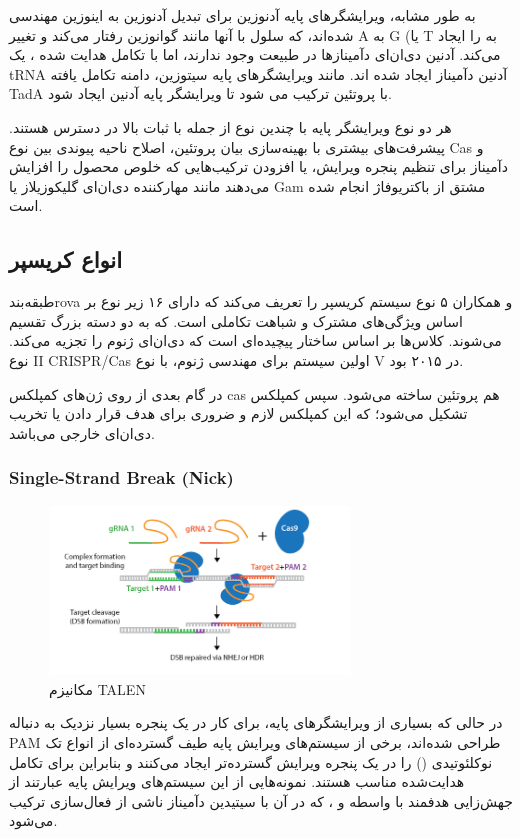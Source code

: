\documentclass[12pt,a4paper,BCOR=.7cm,headsepline,bibliography=totoc]{report}
\begin{document}
به طور مشابه، ویرایشگرهای پایه آدنوزین برای تبدیل آدنوزین به اینوزین مهندسی شده‌اند، که سلول با آنها مانند گوانوزین رفتار می‌کند و تغییر A به G (یا T به  را ایجاد می‌کند. آدنین دی‌ان‌ای دآمینازها در طبیعت وجود ندارند، اما با تکامل هدایت شده ، یک tRNA آدنین دآمیناز ایجاد شده اند. مانند ویرایشگرهای پایه سیتوزین، دامنه تکامل یافته TadA با پروتئین  ترکیب می شود تا ویرایشگر پایه آدنین ایجاد شود.

هر دو نوع ویرایشگر پایه با چندین نوع  از جمله  با ثبات بالا در دسترس هستند. پیشرفت‌های بیشتری با بهینه‌سازی بیان پروتئین، اصلاح ناحیه پیوندی بین نوع Cas و دآمیناز برای تنظیم پنجره ویرایش، یا افزودن ترکیب‌هایی که خلوص محصول را افزایش می‌دهند مانند مهارکننده دی‌ان‌ای گلیکوزیلاز  یا Gam مشتق از باکتریوفاژ  انجام شده است.






\subsection{انواع کریسپر}
طبقه‌بندrova و همکاران ۵ نوع سیستم کریسپر را تعریف می‌کند که دارای ۱۶ زیر نوع بر اساس ویژگی‌های مشترک و شباهت تکاملی است. که به دو دسته بزرگ تقسیم می‌شوند. کلاس‌ها بر اساس ساختار پیچیده‌ای است که دی‌ان‌ای ژنوم را تجزیه می‌کند. نوع II CRISPR/Cas اولین سیستم برای مهندسی ژنوم، با نوع V در ۲۰۱۵ بود.

در گام بعدی از روی ژن‌های کمپلکس cas هم پروتئین  ساخته می‌شود. سپس کمپلکس
  تشکیل می‌شود؛ که این کمپلکس لازم و ضروری برای هدف قرار دادن یا تخریب دی‌ان‌ای خارجی می‌باشد.

\subsubsection{ Single-Strand Break (Nick)}
\begin{figure}
\centering
\includegraphics[width=8cm, ]{pictures/nick.png}
\caption{
مکانیزم TALEN \cite{addgene}
}\label{wrap-fig:4}
\end{figure}
در حالی که بسیاری از ویرایشگرهای پایه، برای کار در یک پنجره بسیار نزدیک به دنباله PAM طراحی شده‌اند، برخی از سیستم‌های ویرایش پایه طیف گسترده‌ای از انواع تک نوکلئوتیدی () را در یک پنجره ویرایش گسترده‌تر ایجاد می‌کنند و بنابراین برای تکامل هدایت‌شده مناسب هستند. نمونه‌هایی از این سیستم‌های ویرایش پایه عبارتند از جهش‌زایی هدفمند با واسطه  و ، که در آن  با سیتیدین دآمیناز  ناشی از فعال‌سازی ترکیب می‌شود.
\end{document}
